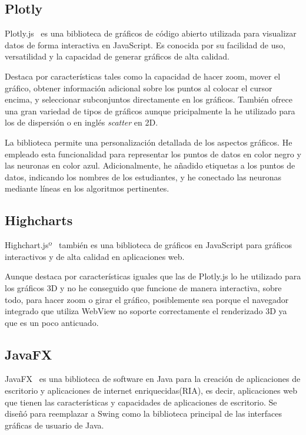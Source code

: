 \subsection{Plotly}

Plotly.js~\cite{plotly} es una biblioteca de gráficos de código abierto utilizada para visualizar datos de forma interactiva en JavaScript. Es conocida por su facilidad de uso, versatilidad y la capacidad de generar gráficos de alta calidad.

Destaca por características tales como la capacidad de hacer zoom, mover el gráfico, obtener información adicional sobre los puntos al colocar el cursor encima, y seleccionar subconjuntos directamente en los gráficos. También ofrece una gran variedad de tipos de gráficos aunque pricipalmente la he utilizado para los de dispersión o en inglés \emph{scatter} en 2D.

La biblioteca permite una personalización detallada de los aspectos gráficos. He empleado esta funcionalidad para representar los puntos de datos en color negro y las neuronas en color azul. Adicionalmente, he añadido etiquetas a los puntos de datos, indicando los nombres de los estudiantes, y he conectado las neuronas mediante líneas en los algoritmos pertinentes.

\subsection{Highcharts}

Highchart.jsº~\cite{highcharts} también es una biblioteca de gráficos en JavaScript para gráficos interactivos y de alta calidad en aplicaciones web.

Aunque destaca por características iguales que las de Plotly.js lo he utilizado para los gráficos 3D y no he conseguido que funcione de manera interactiva, sobre todo, para hacer zoom o girar el gráfico, posiblemente sea porque el navegador integrado que utiliza WebView no soporte correctamente el renderizado 3D ya que es un poco anticuado.

\subsection{JavaFX}

JavaFX~\cite{javafx} es una biblioteca de software en Java para la creación de aplicaciones de escritorio y aplicaciones de internet enriquecidas(RIA), es decir, aplicaciones web que tienen las características y capacidades de aplicaciones de escritorio. Se diseñó para reemplazar a Swing como la biblioteca principal de las interfaces gráficas de usuario de Java.

